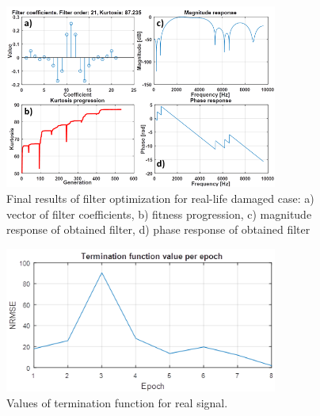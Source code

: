 \documentclass[preprint,12pt]{elsarticle}
\begin{document}
\begin{figure}[ht!]
\centering
\includegraphics[width=0.8\textwidth]{wykresy/real2.png}
\caption{Final results of filter optimization for real-life damaged case: a) vector of filter coefficients, b) fitness progression, c) magnitude response of obtained filter, d) phase response of obtained filter}
\label{fig:real2}
\end{figure}

\begin{figure}[ht!]
\centering
\includegraphics[width=0.8\textwidth]{wykresy/real3.png}
\caption{Values of termination function for real signal.}
\label{fig:real3}
\end{figure}
\end{document}
